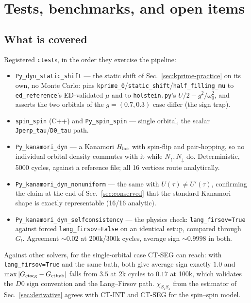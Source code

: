 \documentclass[a4paper,12pt]{article}
\renewcommand{\t}{\ensuremath{\tau}}
\newcommand{\w}{\ensuremath{\omega}}
\newcommand{\Hloc}{\ensuremath{H_{\rm loc}}}
\begin{document}
\section{Tests, benchmarks, and open items}
\label{sec:tests}

\subsection{What is covered}

Registered \texttt{ctest}s, in the order they exercise the pipeline:
\begin{itemize}
  \item \texttt{Py\_dyn\_static\_shift} --- the static shift of
    Sec.~\ref{sec:kprime-practice} on its own, no Monte Carlo: pins
    \texttt{kprime\_0}/\texttt{static\_shift}/\texttt{half\_filling\_mu} to
    \texttt{ed\_reference}'s ED-validated $\mu$ and to \texttt{holstein.py}'s
    $U/2-g^2/\w_0^2$, and asserts the two orbitals of the $g=(0.7,0.3)$ case differ (the
    sign trap).
  \item \texttt{spin\_spin} (C++) and \texttt{Py\_spin\_spin} --- single orbital, the
    scalar \texttt{Jperp\_tau}/\texttt{D0\_tau} path.
  \item \texttt{Py\_kanamori\_dyn} --- a Kanamori $\Hloc$ with spin-flip and pair-hopping,
    so no individual orbital density commutes with it while $N_\uparrow,N_\downarrow$ do.
    Deterministic, 5000 cycles, against a reference file; all 16 vertices route
    analytically.
  \item \texttt{Py\_kanamori\_dyn\_nonuniform} --- the same with $U(\t)\neq U'(\t)$,
    confirming the claim at the end of Sec.~\ref{sec:conserved} that the standard Kanamori
    shape is exactly representable (16/16 analytic).
  \item \texttt{Py\_kanamori\_dyn\_selfconsistency} --- the physics check:
    \texttt{lang\_firsov=True} against forced \texttt{lang\_firsov=False} on an identical
    setup, compared through $G_l$. Agreement ${\sim}0.02$ at 200k/300k cycles, average
    sign ${\sim}0.9998$ in both.
\end{itemize}
Against other solvers, for the single-orbital case CT-SEG can reach: with
\texttt{lang\_firsov=True} and the same bath, both give average sign exactly $1.0$ and
$\max|G_{\rm ctseg}-G_{\rm cthyb}|$ falls from $3.5$ at 2k cycles to $0.17$ at 100k, which
validates the $D0$ sign convention and the Lang--Firsov path. $\chi_{S_zS_z}$ from the
estimator of Sec.~\ref{sec:derivative} agrees with CT-INT and CT-SEG for the spin--spin
model.
\end{document}
